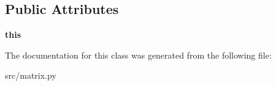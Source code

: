 \subsection*{Public Attributes}
\begin{DoxyCompactItemize}
\item 
\hypertarget{classmatrix_1_1Matrix_acc21534927e527008524f070e1a8f5fd}{
{\bfseries this}}
\label{dd/db9/classmatrix_1_1Matrix_acc21534927e527008524f070e1a8f5fd}

\end{DoxyCompactItemize}


The documentation for this class was generated from the following file:\begin{DoxyCompactItemize}
\item 
src/matrix.py\end{DoxyCompactItemize}
